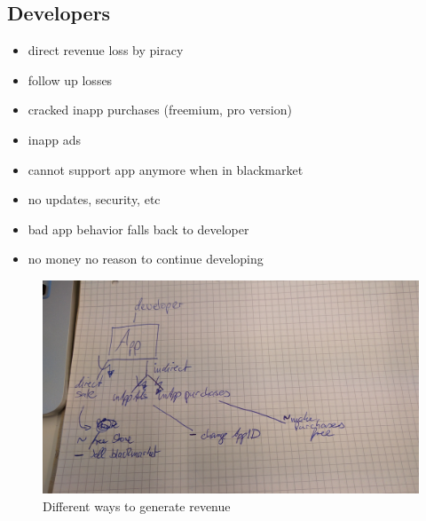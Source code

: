 \subsection{Developers} \label{subsection:foundation-piracy-developers}
\begin{itemize}
  \item direct revenue loss by piracy
  \item follow up losses
  \item cracked inapp purchases (freemium, pro version)
  \item inapp ads
  \item cannot support app anymore when in blackmarket
  \item no updates, security, etc
  \item bad app behavior falls back to developer
  \item no money no reason to continue developing
\end{itemize}
\begin{figure}[h]
    \centering
    \includegraphics[width=1\textwidth]{data/revenue.jpg}
    \caption{Different ways to generate revenue}
    \label{fig:revenue}
\end{figure}
